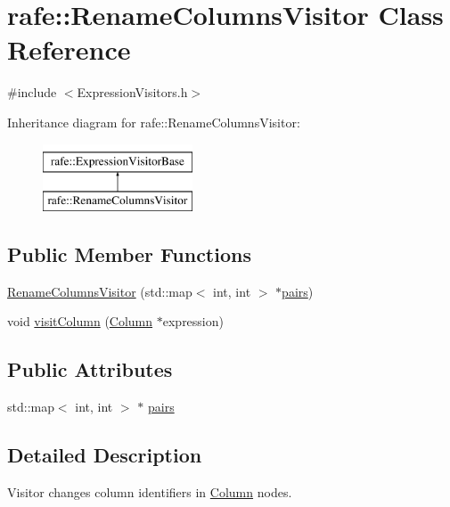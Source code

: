\hypertarget{classrafe_1_1_rename_columns_visitor}{\section{rafe\+:\+:Rename\+Columns\+Visitor Class Reference}
\label{classrafe_1_1_rename_columns_visitor}
}


{\ttfamily \#include $<$Expression\+Visitors.\+h$>$}

Inheritance diagram for rafe\+:\+:Rename\+Columns\+Visitor\+:\begin{figure}[H]
\begin{center}
\leavevmode
\includegraphics[height=2.000000cm]{classrafe_1_1_rename_columns_visitor}
\end{center}
\end{figure}
\subsection*{Public Member Functions}
\begin{DoxyCompactItemize}
\item 
\hyperlink{classrafe_1_1_rename_columns_visitor_a0ed46d425721f07089df6722c8e48542}{Rename\+Columns\+Visitor} (std\+::map$<$ int, int $>$ $\ast$\hyperlink{classrafe_1_1_rename_columns_visitor_a39a19156a5b795544046cf3c933b1148}{pairs})
\item 
void \hyperlink{classrafe_1_1_rename_columns_visitor_af7ca189c54c24f4460f5b79860d0149c}{visit\+Column} (\hyperlink{classrafe_1_1_column}{Column} $\ast$expression)
\end{DoxyCompactItemize}
\subsection*{Public Attributes}
\begin{DoxyCompactItemize}
\item 
std\+::map$<$ int, int $>$ $\ast$ \hyperlink{classrafe_1_1_rename_columns_visitor_a39a19156a5b795544046cf3c933b1148}{pairs}
\end{DoxyCompactItemize}


\subsection{Detailed Description}
Visitor changes column identifiers in \hyperlink{classrafe_1_1_column}{Column} nodes. 

